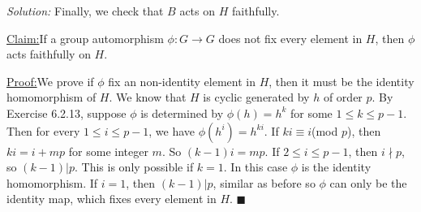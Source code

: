 \documentclass[a4paper, 12pt]{article}
\newenvironment{solution}
    {\textit{Solution:}}
    {}
\newenvironment{claim}[1]{\par\noindent\underline{Claim:}\space#1}{}
\newenvironment{claimproof}[1]{\par\noindent\underline{Proof:}\space#1}{\hfill $\blacksquare$}
\begin{document}
\begin{solution}
Finally, we check that \(B\) acts on \(H\) faithfully.
\begin{claim}
If a group automorphism \(\phi:G\rightarrow G\) does not fix every element in \(H\), then \(\phi\) acts faithfully on \(H\).
\end{claim}
\begin{claimproof}
We prove if \(\phi\) fix an non-identity element in \(H\), then it must be the identity homomorphism of \(H\). We know that \(H\) is cyclic generated by \(h\) of order \(p\). By Exercise 6.2.13, suppose \(\phi\) is determined by \(\phi(h)=h^k\) for some \(1\leq k\leq p-1\). Then for every \(1\leq i\leq p-1\), we have 
\(\phi(h^i)=h^{ki}\). If \(ki\equiv i\)(mod \(p\)), then \(ki=i+mp\) for some integer \(m\). So \((k-1)i=mp\). If \(2\leq i\leq p-1\), then \(i\nmid p\), so \((k-1)|p\). This is only possible if \(k=1\). In this case 
\(\phi\) is the identity homomorphism. If \(i=1\), then \((k-1)|p\), similar as before so \(\phi\) can only be the identity map, which fixes every element in \(H\).
\end{claimproof}
\end{solution}
\end{document}
